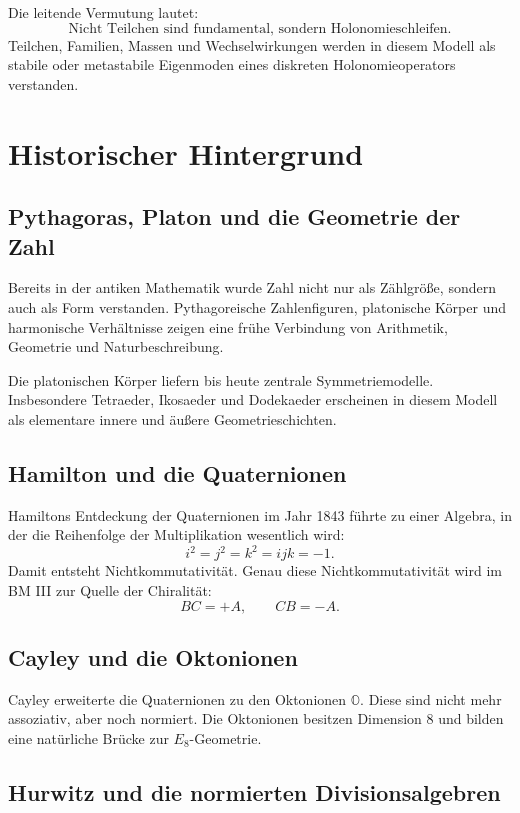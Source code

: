 \documentclass[11pt,a4paper]{article}
\theoremstyle{definition}
\begin{document}
	Die leitende Vermutung lautet:
	\[
	\boxed{\text{Nicht Teilchen sind fundamental, sondern Holonomieschleifen.}}
	\]
	Teilchen, Familien, Massen und Wechselwirkungen werden in diesem Modell als stabile oder metastabile Eigenmoden eines diskreten Holonomieoperators verstanden.
	
	\section{Historischer Hintergrund}
	
	\subsection{Pythagoras, Platon und die Geometrie der Zahl}
	
	Bereits in der antiken Mathematik wurde Zahl nicht nur als Zählgröße, sondern auch als Form verstanden. Pythagoreische Zahlenfiguren, platonische Körper und harmonische Verhältnisse zeigen eine frühe Verbindung von Arithmetik, Geometrie und Naturbeschreibung.
	
	Die platonischen Körper liefern bis heute zentrale Symmetriemodelle. Insbesondere Tetraeder, Ikosaeder und Dodekaeder erscheinen in diesem Modell als elementare innere und äußere Geometrieschichten.
	
	\subsection{Hamilton und die Quaternionen}
	
	Hamiltons Entdeckung der Quaternionen im Jahr 1843 führte zu einer Algebra, in der die Reihenfolge der Multiplikation wesentlich wird:
	\[
	i^2=j^2=k^2=ijk=-1.
	\]
	Damit entsteht Nichtkommutativität. Genau diese Nichtkommutativität wird im BM III zur Quelle der Chiralität:
	\[
	BC=+A,\qquad CB=-A.
	\]
	
	\subsection{Cayley und die Oktonionen}
	
	Cayley erweiterte die Quaternionen zu den Oktonionen \(\mathbb O\). Diese sind nicht mehr assoziativ, aber noch normiert. Die Oktonionen besitzen Dimension \(8\) und bilden eine natürliche Brücke zur \(E_8\)-Geometrie.
	
	\subsection{Hurwitz und die normierten Divisionsalgebren}
	
\end{document}
